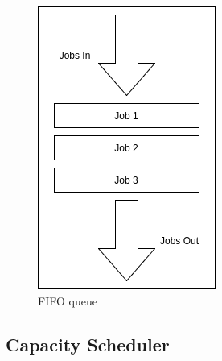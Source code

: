 \begin{figure}[H]
  \centering
  \includegraphics[scale=0.7]{./images/fifo-scheduler.png}
  \caption{FIFO queue}
  \label{fig:fifo-scheduler}
\end{figure}

\subsection{Capacity Scheduler}